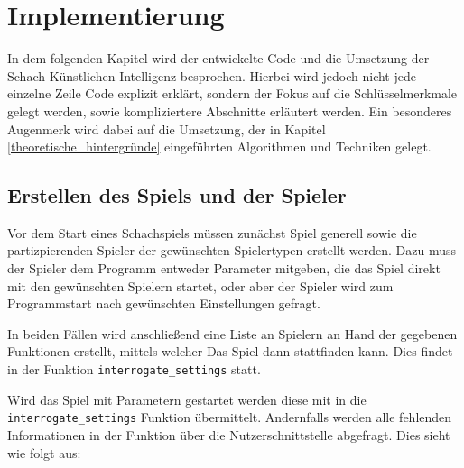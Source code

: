
\chapter{Implementierung}
In dem folgenden Kapitel wird der entwickelte Code und die Umsetzung der Schach-Künstlichen Intelligenz besprochen. Hierbei wird jedoch nicht jede einzelne Zeile Code explizit erklärt, sondern der Fokus auf die Schlüsselmerkmale gelegt werden, sowie kompliziertere Abschnitte erläutert werden. Ein besonderes Augenmerk wird dabei auf die Umsetzung, der in Kapitel \ref{theoretische_hintergründe} eingeführten Algorithmen und Techniken gelegt.

\section{Erstellen des Spiels und der
Spieler}\label{erstellen-des-spiels-und-der-spieler}

Vor dem Start eines Schachspiels müssen zunächst Spiel generell sowie
die partizpierenden Spieler der gewünschten Spielertypen erstellt
werden. Dazu muss der Spieler dem Programm entweder Parameter mitgeben,
die das Spiel direkt mit den gewünschten Spielern startet, oder aber der
Spieler wird zum Programmstart nach gewünschten Einstellungen gefragt.

In beiden Fällen wird anschließend eine Liste an Spielern an Hand der
gegebenen Funktionen erstellt, mittels welcher Das Spiel dann
stattfinden kann. Dies findet in der Funktion
\texttt{interrogate\_settings} statt.

Wird das Spiel mit Parametern gestartet werden diese mit in die
\texttt{interrogate\_settings} Funktion übermittelt. Andernfalls werden
alle fehlenden Informationen in der Funktion über die
Nutzerschnittstelle abgefragt. Dies sieht wie folgt aus:

